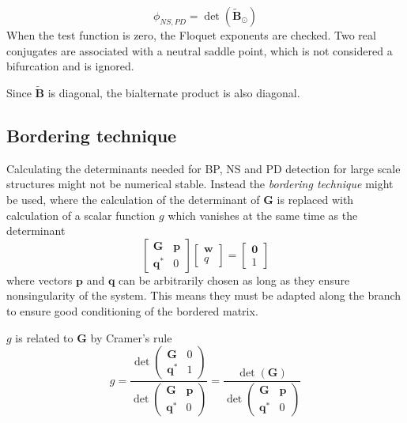 \begin{equation}
  \phi_{NS,PD} = \det \left( \tilde{\bm B}_\odot \right)
\end{equation}
When the test function is zero, the Floquet exponents are checked. Two real
conjugates are associated with a neutral saddle point, which is not considered a
bifurcation and is ignored.

Since $\tilde{\bm B}$ is diagonal, the bialternate product is also diagonal.

\subsection{Bordering technique}
\label{sec:bordering_tech}

Calculating the determinants needed for BP, NS and PD detection for large
scale structures might not be numerical stable. Instead the \textit{bordering
  technique} might be used, where the calculation of the determinant of $\bm G$
is replaced with calculation of a scalar function $g$ which vanishes at the same
time as the determinant \cite{kuznetsov2013}
\begin{equation}
  \begin{bmatrix}
    \bm G & \bm p \\
    \bm q^* & 0
  \end{bmatrix}
  \begin{bmatrix}
    \bm w \\ q
  \end{bmatrix}
  =
  \begin{bmatrix}
    \bm 0 \\ 1
  \end{bmatrix}
  \label{eq:bordered_system}
\end{equation}
where vectors $\bm p$ and $\bm q$ can be arbitrarily chosen as long as they
ensure nonsingularity of the system. This means they must be adapted along the
branch to ensure good conditioning of the bordered matrix.

$g$ is related to $\bm G$ by Cramer's rule
\begin{equation}
  g = \frac{\det
    \begin{pmatrix}
      \bm G & 0 \\
      \bm q^* & 1
    \end{pmatrix}}
  {\det
    \begin{pmatrix}
      \bm G & \bm p \\
      \bm q^* & 0
    \end{pmatrix}}
  =
  \frac{\det(\bm G)}
  {\det
    \begin{pmatrix}
      \bm G & \bm p \\
      \bm q^* & 0
    \end{pmatrix}}
\end{equation}


